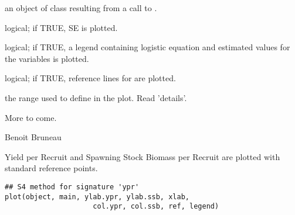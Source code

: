 \documentclass[a4paper]{book}
\begin{document}
\begin{Arguments}
\begin{ldescription}
\item[\code{object}] an object of class  resulting from a call to .

\item[\code{se.pred}] logical; if TRUE, SE is plotted.

\item[\code{leg}] logical; if TRUE, a legend containing logistic equation and estimated values for the variables is plotted.

\item[\code{ref}] logical; if TRUE, reference lines for  are plotted.

\item[\code{range.x}] the range used to define  in the plot. Read 'details'.

\end{ldescription}
\end{Arguments}
%
\begin{Details}\relax
More to come.
\end{Details}
%
\begin{Author}\relax
Benoit Bruneau
\end{Author}
\newpage
{}
%
\begin{Description}\relax
Yield per Recruit and Spawning Stock Biomass per Recruit are plotted with standard reference points. 
\end{Description}
%
\begin{Usage}
\begin{verbatim}
## S4 method for signature 'ypr'
plot(object, main, ylab.ypr, ylab.ssb, xlab, 
                     col.ypr, col.ssb, ref, legend)
\end{verbatim}
\end{Usage}
%
\end{document}
